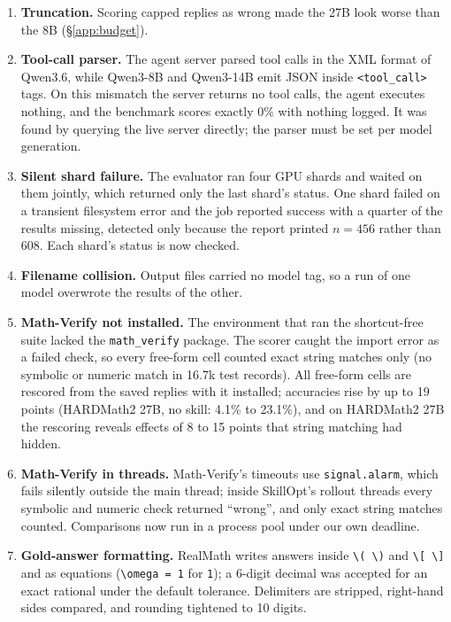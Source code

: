 \documentclass[11pt]{article}
\begin{document}
\begin{enumerate}
  \item \textbf{Truncation.} Scoring capped replies as wrong made the 27B look worse than the 8B
  (\S\ref{app:budget}).
  \item \textbf{Tool-call parser.} The agent server parsed tool calls in the XML format of Qwen3.6,
  while Qwen3-8B and Qwen3-14B emit JSON inside \texttt{<tool\_call>} tags. On this mismatch the
  server returns no tool calls, the agent executes nothing, and the benchmark scores exactly 0\% with
  nothing logged. It was found by querying the live server directly; the parser must be set per model
  generation.
  \item \textbf{Silent shard failure.} The evaluator ran four GPU shards and waited on them jointly,
  which returned only the last shard's status. One shard failed on a transient filesystem error and
  the job reported success with a quarter of the results missing, detected only because the report
  printed $n=456$ rather than 608. Each shard's status is now checked.
  \item \textbf{Filename collision.} Output files carried no model tag, so a run of one model
  overwrote the results of the other.
  \item \textbf{Math-Verify not installed.} The environment that ran the shortcut-free suite lacked
  the \texttt{math\_verify} package. The scorer caught the import error as a failed check, so every
  free-form cell counted exact string matches only (no symbolic or numeric match in 16.7k test
  records). All free-form cells are rescored from the saved replies with it installed; accuracies rise
  by up to 19 points (HARDMath2 27B, no skill: 4.1\% to 23.1\%), and on HARDMath2 27B the rescoring
  reveals effects of 8 to 15 points that string matching had hidden.
  \item \textbf{Math-Verify in threads.} Math-Verify's timeouts use \texttt{signal.alarm}, which
  fails silently outside the main thread; inside SkillOpt's rollout threads every symbolic and
  numeric check returned ``wrong'', and only exact string matches counted. Comparisons now run in a
  process pool under our own deadline.
  \item \textbf{Gold-answer formatting.} RealMath writes answers inside \verb|\( \)| and \verb|\[ \]|
  and as equations (\verb|\omega = 1| for \verb|1|); a 6-digit decimal was accepted for an exact
  rational under the default tolerance. Delimiters are stripped, right-hand sides compared, and
  rounding tightened to 10 digits.

\end{enumerate}
\end{document}
